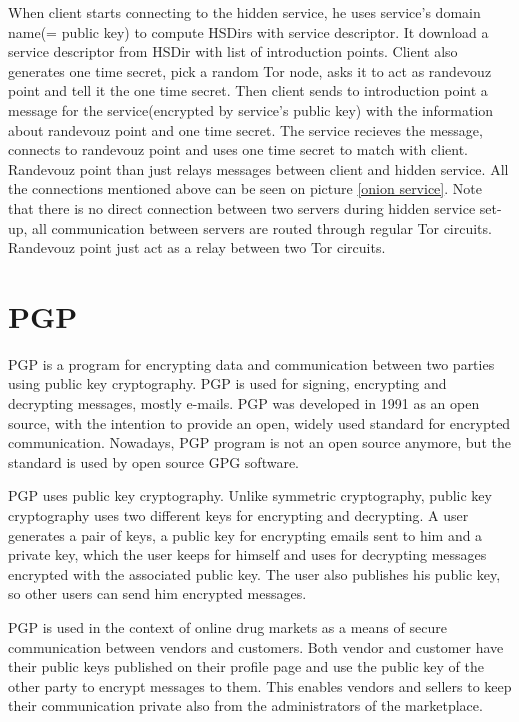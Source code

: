 \documentclass[
  digital, %
  table,   %
  lof,     %
  lot,     %
  oneside
]{fithesis3}
\begin{document}
When client starts connecting to the hidden service, he uses service's domain name(= public key)
to compute HSDirs with service descriptor. It download a service descriptor from HSDir with list
of introduction points. Client also generates one time secret, pick a random Tor node, asks
it to act as randevouz point and tell it the one time secret. 
Then client sends to introduction point a message for the service(encrypted by service's public key)
with the information about randevouz point and one time secret. The service recieves the message, connects 
to randevouz point and uses one time secret to match with client.
Randevouz point than just relays messages between client and hidden service.
All the connections mentioned above can be seen on picture \ref{onion service}.
Note that there is no direct connection between two servers during hidden service set-up,
all communication between servers are routed through regular Tor circuits.
Randevouz point just act as a relay between two Tor circuits.

\section{PGP}

PGP \parencite{Zimmermann:1995:OPU:202735} is a program for encrypting data
and communication between two parties using public key cryptography.
PGP is used for signing, encrypting and decrypting messages, mostly e-mails.
PGP was developed in 1991 as an open source, with the intention 
to provide an open, widely used standard for encrypted communication.
Nowadays, PGP program is not an open source anymore, but the standard is used by open source GPG software.

PGP uses public key cryptography. Unlike symmetric cryptography, public key cryptography
uses two different keys for encrypting and decrypting.
A user generates a pair of keys, a public key for encrypting emails sent to him and a private key, which the user
 keeps for himself and uses for decrypting messages encrypted with the associated public key.
 The user also publishes his public key, so other users can send him encrypted messages.

PGP is used in the context of online drug markets as a means of secure communication between vendors and customers.
Both vendor and customer have their public keys published on their profile page and use the public key of the other
party to encrypt messages to them. This enables vendors and sellers to keep their communication private also from the administrators of the marketplace.
\end{document}
